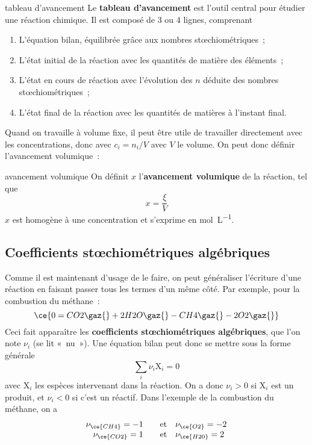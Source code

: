 \documentclass[../main/main.tex]{subfiles}
\begin{document}
\vspace{-12pt}
\begin{defi}[label=def:tabav]{tableau d'avancement}
    Le \textbf{tableau d'avancement} est l'outil central pour étudier une
    réaction chimique. Il est composé de 3 ou 4 lignes, comprenant
    \begin{enumerate}
        \item L'équation bilan, équilibrée grâce aux nombres stœchiométriques~;
        \item L'état initial de la réaction avec les quantités de matière des
            éléments~;
        \item L'état en cours de réaction avec l'évolution des $n$ déduite des
            nombres stœchiométriques~;
        \item L'état final de la réaction avec les quantités de matières à
            l'instant final.
    \end{enumerate}
\end{defi}

Quand on travaille à volume fixe, il peut être utile de travailler directement
avec les concentrations, donc avec $c_i = n_i/V$ avec $V$ le volume. On peut
donc définir l'avancement volumique~:

\begin{defi}[label=def:x, sidebyside, righthand ratio=.3]{avancement volumique}
    On définit $x$ l'\textbf{avancement volumique} de la réaction, tel que
    \[ \boxed{x = \frac{\xi}{V}}\]
    \tcblower
    $x$ est homogène à une concentration et s'exprime en \si{mol.L^{-1}}.
\end{defi}

\subsection{Coefficients stœchiométriques algébriques}

Comme il est maintenant d'usage de le faire, on peut généraliser l'écriture
d'une réaction en faisant passer tous les termes d'un même côté. Par exemple,
pour la combustion du méthane~:
\[\ce{0 = CO2\gaz{} + 2H2O\gaz{} - CH4\gaz{} - 2O2\gaz{}}\]
Ceci fait apparaître les \textbf{coefficients stœchiométriques algébriques}, que
l'on note $\nu_i$ (se lit «~nu~»). Une équation bilan peut donc se mettre sous
la forme générale
\[ \boxed{\sum_i \nu_i\mathrm{X}_i = 0}\]
avec $\mathrm{X}_i$ les espèces intervenant dans la réaction. On a donc $\nu_i
>0$ si $\mathrm{X}_i$ est un produit, et $\nu_i < 0$ si c'est un réactif. Dans
l'exemple de la combustion du méthane, on a
\[ \begin{array}{rcl}
    \nu_{\ce{CH4}} = -1 \quad &\text{et}& \nu_{\ce{O2}}=-2\\
    \nu_{\ce{CO2}} = 1 \quad &\text{et}& \nu_{\ce{H20}}=2
\end{array}
\]
\end{document}

